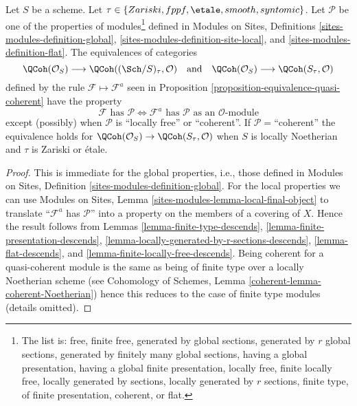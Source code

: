 \begin{lemma}
\label{lemma-equivalence-quasi-coherent-properties}
Let $S$ be a scheme.
Let $\tau \in \{Zariski, \linebreak[0] fppf, \linebreak[0]
\etale, \linebreak[0] smooth, \linebreak[0] syntomic\}$.
Let $\mathcal{P}$ be one of the properties of modules\footnote{The list is:
free, finite free, generated by global sections,
generated by $r$ global sections, generated by finitely many global sections,
having a global presentation, having a global finite presentation,
locally free, finite locally free, locally generated by sections,
locally generated by $r$ sections, finite type, of finite presentation,
coherent, or flat.} defined in
Modules on Sites, Definitions \ref{sites-modules-definition-global},
\ref{sites-modules-definition-site-local}, and
\ref{sites-modules-definition-flat}.
The equivalences of categories
$$
\QCoh(\mathcal{O}_S)
\longrightarrow
\QCoh((\Sch/S)_\tau, \mathcal{O})
\quad\text{and}\quad
\QCoh(\mathcal{O}_S)
\longrightarrow
\QCoh(S_\tau, \mathcal{O})
$$
defined by the rule $\mathcal{F} \mapsto \mathcal{F}^a$ seen in
Proposition \ref{proposition-equivalence-quasi-coherent}
have the property
$$
\mathcal{F}\text{ has }\mathcal{P}
\Leftrightarrow
\mathcal{F}^a\text{ has }\mathcal{P}\text{ as an }\mathcal{O}\text{-module}
$$
except (possibly) when $\mathcal{P}$ is ``locally free'' or ``coherent''.
If $\mathcal{P}=$``coherent'' the equivalence
holds for $\QCoh(\mathcal{O}_S) \to \QCoh(S_\tau, \mathcal{O})$
when $S$ is locally Noetherian and $\tau$ is Zariski or \'etale.
\end{lemma}

\begin{proof}
This is immediate for the global properties, i.e., those defined in
Modules on Sites, Definition \ref{sites-modules-definition-global}.
For the local properties we can use
Modules on Sites, Lemma \ref{sites-modules-lemma-local-final-object}
to translate ``$\mathcal{F}^a$ has $\mathcal{P}$'' into a property
on the members of a covering of $X$. Hence the result follows from
Lemmas \ref{lemma-finite-type-descends},
\ref{lemma-finite-presentation-descends},
\ref{lemma-locally-generated-by-r-sections-descends},
\ref{lemma-flat-descends}, and
\ref{lemma-finite-locally-free-descends}.
Being coherent for a quasi-coherent module is the same as being
of finite type over a locally Noetherian scheme (see
Cohomology of Schemes, Lemma \ref{coherent-lemma-coherent-Noetherian})
hence this reduces
to the case of finite type modules (details omitted).
\end{proof}

